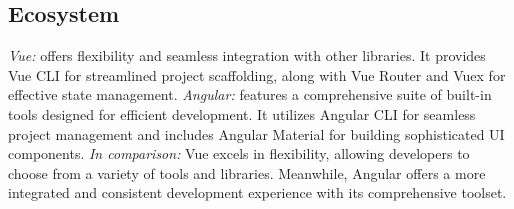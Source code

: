 \subsection{Ecosystem}

\textit{Vue:} offers flexibility and seamless integration with other libraries. It provides Vue CLI for streamlined project scaffolding, along with Vue Router and Vuex for effective state management.
\newline\textit{Angular:} features a comprehensive suite of built-in tools designed for efficient development. It utilizes Angular CLI for seamless project management and includes Angular Material for building sophisticated UI components.
\newline\textit{In comparison:} Vue excels in flexibility, allowing developers to choose from a variety of tools and libraries. Meanwhile, Angular offers a more integrated and consistent development experience with its comprehensive toolset.





